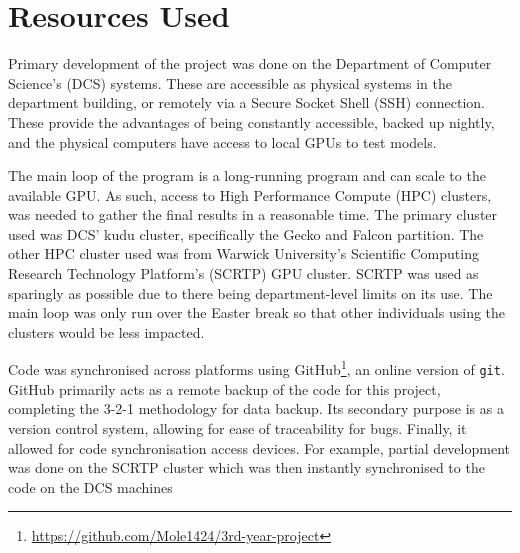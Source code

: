 \section{Resources Used}


Primary development of the project was done on the Department of Computer Science's (DCS) systems. These are accessible as physical systems in the department building, or remotely via a Secure Socket Shell (SSH) connection. These provide the advantages of being constantly accessible, backed up nightly, and the physical computers have access to local GPUs to test models.

The main loop of the program is a long-running program and can scale to the available GPU. As such, access to High Performance Compute (HPC) clusters, was needed to gather the final results in a reasonable time. The primary cluster used was DCS' kudu cluster, specifically the Gecko and Falcon partition. The other HPC cluster used was from Warwick University's Scientific Computing Research Technology Platform's (SCRTP) GPU cluster. SCRTP was used as sparingly as possible due to there being department-level limits on its use. The main loop was only run over the Easter break so that other individuals using the clusters would be less impacted.

Code was synchronised across platforms using GitHub\footnote{\url{https://github.com/Mole1424/3rd-year-project}}, an online version of \verb|git|. GitHub primarily acts as a remote backup of the code for this project, completing the 3-2-1 methodology for data backup\cite{seagate321}. Its secondary purpose is as a version control system, allowing for ease of traceability for bugs. Finally, it allowed for code synchronisation access devices. For example, partial development was done on the SCRTP cluster which was then instantly synchronised to the code on the DCS machines

